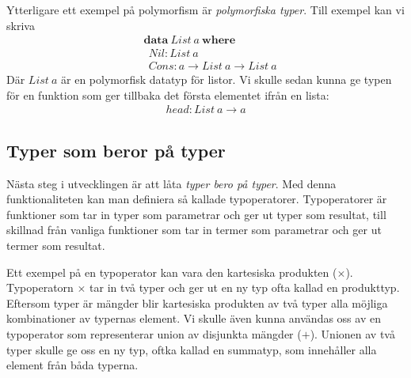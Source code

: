 Ytterligare ett exempel på polymorfism är \emph{polymorfiska typer}. Till
exempel kan vi skriva
\begin{align*}
  &\boldsymbol{data}\ List\ a\ \boldsymbol{where} \\
  &\ \ Nil : List\ a \\
  &\ \ Cons : a \to List\ a \to List\ a
\end{align*}
Där $List\ a$ är en polymorfisk datatyp för listor. Vi skulle sedan kunna ge
typen för en funktion som ger tillbaka det första elementet ifrån en lista:
\begin{align*}
  head : List\ a \to a
\end{align*}

\subsection{Typer som beror på typer}
Nästa steg i utvecklingen är att låta \emph{typer bero på typer}. Med denna
funktionaliteten kan man definiera så kallade typoperatorer. Typoperatorer är
funktioner som tar in typer som parametrar och ger ut typer som resultat, till
skillnad från vanliga funktioner som tar in termer som parametrar och ger ut
termer som resultat.

Ett exempel på en typoperator kan vara den kartesiska produkten ($\times$).
Typoperatorn $\times$ tar in två typer och ger ut en ny typ ofta kallad en
produkttyp. Eftersom typer är mängder blir kartesiska produkten av två typer
alla möjliga kombinationer av typernas element. Vi skulle även kunna användas
oss av en typoperator som representerar union av disjunkta mängder ($+$).
Unionen av två typer skulle ge oss en ny typ, oftka kallad en summatyp, som
innehåller alla element från båda typerna.

